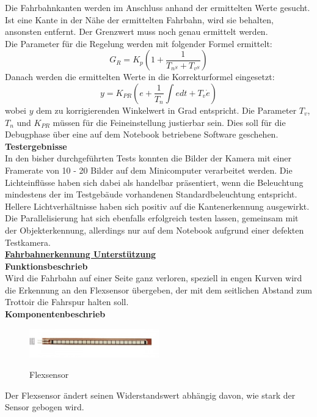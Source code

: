 Die Fahrbahnkanten werden im Anschluss anhand der ermittelten Werte gesucht. Ist eine Kante in der Nähe der ermittelten Fahrbahn, wird sie behalten, ansonsten entfernt. Der Grenzwert muss noch genau ermittelt werden.\\
Die Parameter für die Regelung werden mit folgender Formel ermittelt:
\[
G_R = K_p\left(1 + \frac{1}{T_{n^S} + T_{v^S}}\right)
\]
Danach werden die ermittelten Werte in die Korrekturformel eingesetzt:
\[
y = K_{PR}\left(e + \frac{1}{T_n}\int{edt} + T_v\dot{e}\right)
\]
wobei $y$ dem zu korrigierenden Winkelwert in Grad entspricht. Die Parameter $T_v$, $T_n$ und $K_{PR}$ müssen für die Feineinstellung justierbar sein. Dies soll für die Debugphase über eine auf dem Notebook betriebene Software geschehen.
\\[0.2cm]
\textbf{Testergebnisse}\\[0.2cm]
In den bisher durchgeführten Tests konnten die Bilder der Kamera mit einer Framerate von 10 - 20 Bilder auf dem Minicomputer verarbeitet werden. Die Lichteinflüsse haben sich dabei als handelbar präsentiert, wenn die Beleuchtung mindestens der im Testgebäude vorhandenen Standardbeleuchtung entspricht. Hellere Lichtverhältnisse haben sich positiv auf die Kantenerkennung ausgewirkt.\\
Die Parallelisierung hat sich ebenfalls erfolgreich testen lassen, gemeinsam mit der Objekterkennung, allerdings nur auf dem Notebook aufgrund einer defekten Testkamera.
\\[0.2cm]
\underline{\textbf{Fahrbahnerkennung Unterstützung}}
\\[0.2cm]
\textbf{Funktionsbeschrieb}\\[0.2cm]
Wird die Fahrbahn auf einer Seite ganz verloren, speziell in engen Kurven wird die Erkennung an den Flexsensor übergeben, der mit dem seitlichen Abstand zum Trottoir die Fahrspur halten soll.\\[0.2cm]
\textbf{Komponentenbeschrieb}\\[0.2cm]
\begin{figure}[H]
	\centering
	\includegraphics[width=0.5\textwidth]{03_Loesungskonzept/pictures/Flexsensor.jpg}
	\label{fig:Flexsensor}
	\caption{Flexsensor}
\end{figure}\flushleft%
Der Flexsensor ändert seinen Widerstandswert abhängig davon, wie stark der Sensor gebogen wird. \\[0.2cm]
